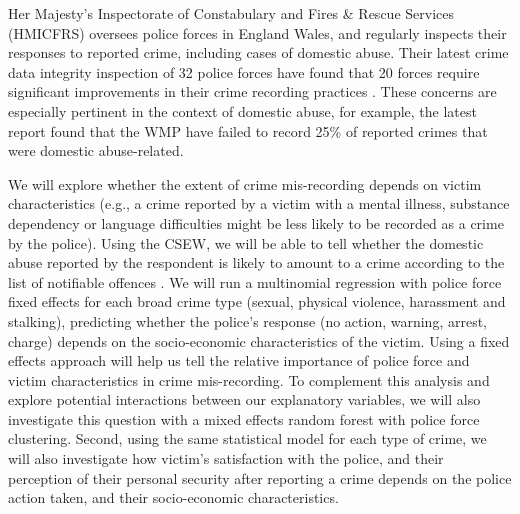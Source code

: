 \documentclass[11pt, a4paper]{article}
\begin{document}
 
 Her Majesty's Inspectorate of Constabulary and Fires \& Rescue Services (HMICFRS) oversees police forces in England Wales, and regularly inspects their responses to reported crime, including cases of domestic abuse. Their latest crime data integrity inspection of 32 police forces have found that 20 forces require significant improvements in their crime recording practices \cite{HerMajestysInspectorateofConstabularyandFires&RescueServices2019}. These concerns are especially pertinent in the context of domestic abuse, for example, the latest report found that the WMP have failed to record 25\% of reported crimes that were domestic abuse-related.
 
 

 We will explore whether the extent of crime mis-recording depends on victim characteristics (e.g., a crime reported by a victim with a mental illness, substance dependency or language difficulties might be less likely to be recorded as a crime by the police). Using the CSEW, we will be able to tell whether the domestic abuse reported by the respondent is likely to amount to a crime according to the list of notifiable offences \cite{countingrules}. We will run a multinomial regression with police force fixed effects for each broad crime type (sexual, physical violence, harassment and stalking), predicting whether the police's response (no action, warning, arrest, charge) depends on the socio-economic characteristics of the victim. Using a fixed effects approach will help us tell the relative importance of police force and victim characteristics in crime mis-recording. To complement this analysis and explore potential interactions between our explanatory variables, we will also investigate this question with a mixed effects random forest with police force clustering. Second, using the same statistical model for each type of crime, we will also investigate how victim's satisfaction with the police, and their perception of their personal security after reporting a crime depends on the police action taken, and their socio-economic characteristics.  
 
% 
% 
   
\end{document}
